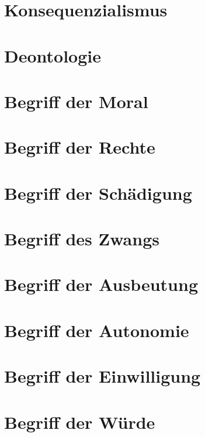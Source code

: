 \documentclass[../main.tex]{subfiles}
\begin{document}
\section{Konsequenzialismus} \label{konsequenzialismus}


\section{Deontologie}


\section{Begriff der Moral}


\section{Begriff der Rechte}


\section{Begriff der Schädigung}


\section{Begriff des Zwangs}


\section{Begriff der Ausbeutung}


\section{Begriff der Autonomie}


\section{Begriff der Einwilligung}


\section{Begriff der Würde}

\end{document}
